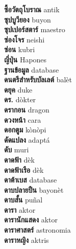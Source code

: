 \textbf{ ซื้อวัตถุโบราณ  } antik \\
\textbf{ ซุปบูวียอง  } buyon \\
\textbf{ ซุปเปอร์สตาร์  } maestro \\
\textbf{ ซ่องโจร  } neishi \\
\textbf{ ซ่อน  } kubri \\
\textbf{ ญี่ปุ่น  } Hapones \\
\textbf{ ฐานข้อมูล  } database \\
\textbf{ ดนตรีสำหรับบัลเลต์  } balèt \\
\textbf{ ดยุค  } duke \\
\textbf{ ดร.  } dòkter \\
\textbf{ ดรากอน  } dragon \\
\textbf{ ดวงหน้า  } cara \\
\textbf{ ดอกตูม  } kònòpi \\
\textbf{ ดัดแปลง  } adaptá \\
\textbf{ ดับ  } muri \\
\textbf{ ดาดฟ้า  } dèk \\
\textbf{ ดาดฟ้าเรือ  } dèk \\
\textbf{ ดาต้าเบส  } database \\
\textbf{ ดาบปลายปืน  } bayonèt \\
\textbf{ ดาบสั้น  } puñal \\
\textbf{ ดารา  } aktor \\
\textbf{ ดารานักแสดง  } aktor \\
\textbf{ ดาราศาสตร์  } astronomia \\
\textbf{ ดาราหญิง  } aktris \\
